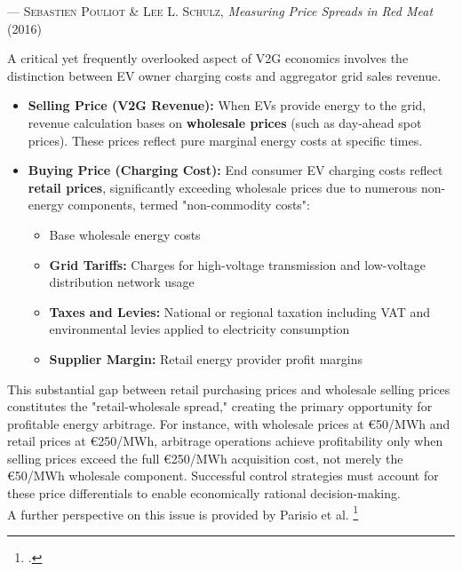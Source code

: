 \vspace{0.5cm}

\begin{flushright}
  --- \textsc{Sebastien Pouliot \& Lee L. Schulz}, \textit{Measuring Price Spreads in Red Meat} (2016)
\end{flushright}
\noindent
A critical yet frequently overlooked aspect of V2G economics involves the distinction between EV owner charging costs and aggregator grid sales revenue.

\begin{itemize}
    \item \textbf{Selling Price (V2G Revenue):} When EVs provide energy to the grid, revenue calculation bases on \textbf{wholesale prices} (such as day-ahead spot prices). These prices reflect pure marginal energy costs at specific times.
    
    \item \textbf{Buying Price (Charging Cost):} End consumer EV charging costs reflect \textbf{retail prices}, significantly exceeding wholesale prices due to numerous non-energy components, termed "non-commodity costs":
    \begin{itemize}
        \item Base wholesale energy costs
        \item \textbf{Grid Tariffs:} Charges for high-voltage transmission and low-voltage distribution network usage
        \item \textbf{Taxes and Levies:} National or regional taxation including VAT and environmental levies applied to electricity consumption
        \item \textbf{Supplier Margin:} Retail energy provider profit margins
    \end{itemize}
\end{itemize}
\noindent
This substantial gap between retail purchasing prices and wholesale selling prices constitutes the "retail-wholesale spread," creating the primary opportunity for profitable energy arbitrage. For instance, with wholesale prices at €50/MWh and retail prices at €250/MWh, arbitrage operations achieve profitability only when selling prices exceed the full €250/MWh acquisition cost, not merely the €50/MWh wholesale component. Successful control strategies must account for these price differentials to enable economically rational decision-making.
\noindent
\\
A further perspective on this issue is provided by Parisio et al. 
\footcite{parisio2014mpc}
